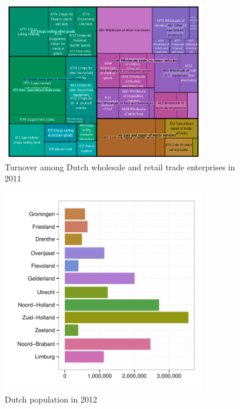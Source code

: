 \documentclass[journal]{vgtc}                %
\begin{document}
\begin{figure}[htb]
  \centering
  \includegraphics[width=3.5in]{TMbusiness.pdf}
  \caption{Turnover among Dutch wholesale and retail trade enterprises in 2011}\label{fig:treemapApp}
\end{figure}




\begin{figure}[htb]
  \centering
  \includegraphics[width=3.5in]{pop_bar.pdf}

  \caption{Dutch population in 2012}\label{fig:barApp}

\end{figure}
\end{document}
